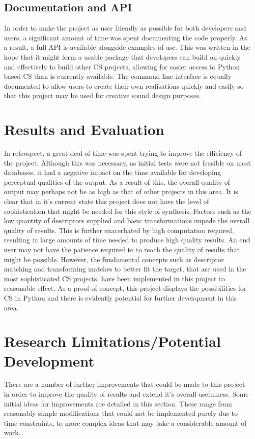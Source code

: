 \documentclass{scrartcl}
\begin{document}
    \subsection*{Documentation and API}
    In order to make the project as user friendly as possible for both
    developers and users, a significant amount of time was spent documenting
    the code properly. As a result, a full API is available alongside examples
    of use. This was written in the hope that it might form a usable package
    that developers can build on quickly and effectively to build other CS
    projects, allowing for easier access to Python based CS than is currently
    available. The command line interface is equally documented to allow users
    to create their own realisations quickly and easily so that this project
    may be used for creative sound design purposes.

    \section*{Results and Evaluation}
    In retrospect, a great deal of time was spent trying to improve the
    efficiency of the project. Although this was necessary, as initial tests
    were not feasible on most databases, it had a negative impact on the time
    available for developing perceptual qualities of the output. As a result of
    this, the overall quality of output may perhaps not be as high as that of
    other projects in this area. It is clear that in it's current state this
    project does not have the level of sophistication that might be needed for
    this style of synthesis. Factors such as the low quantity of descriptors
    supplied and basic transformations impede the overall quality of results.
    This is further exacerbated by high computation required, resulting in
    large amounts of time needed to produce high quality results. An end user
    may not have the patience required to to reach the quality of results that
    might be possible. However, the fundamental concepts such as descriptor
    matching and transforming matches to better fit the target, that are used
    in the most sophisticated CS projects, have been implemented in this
    project to reasonable effect. As a proof of concept, this project displays
    the possibilities for CS in Python and there is evidently potential for
    further development in this area.

    \section*{Research Limitations/Potential Development}
    There are a number of further improvements that could be made to this
    project in order to improve the quality of results and extend it's overall
    usefulness. Some initial ideas for improvements are detailed in this
    section. These range from reasonably simple modifications that could not be
    implemented purely due to time constraints, to more complex ideas that may
    take a considerable amount of work.\\
\end{document}
